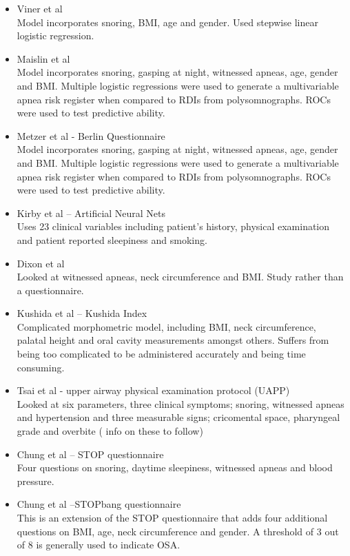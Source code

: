 \begin{itemize}
\item Viner et al\\
Model incorporates snoring, BMI, age and gender. Used stepwise linear logistic regression.
\item Maislin et al\\
Model incorporates snoring, gasping at night, witnessed apneas, age, gender and BMI. Multiple logistic regressions were used to generate a multivariable apnea risk register when compared to RDIs from polysomnographs. ROCs were used to test predictive ability. 
\item Metzer et al - Berlin Questionnaire\\
Model incorporates snoring, gasping at night, witnessed apneas, age, gender and BMI. Multiple logistic regressions were used to generate a multivariable apnea risk register when compared to RDIs from polysomnographs. ROCs were used to test predictive ability. 
\item Kirby et al – Artificial Neural Nets\\
Uses 23 clinical variables including patient’s history, physical examination and patient reported sleepiness and smoking.
\item Dixon et al\\
Looked at witnessed apneas, neck circumference and BMI. Study rather than a questionnaire. 
\item Kushida et al – Kushida Index\\
Complicated morphometric model, including BMI, neck circumference, palatal height and oral cavity measurements amongst others. Suffers from being too complicated to be administered accurately and being time consuming.
\item Tsai et al - upper airway physical examination protocol (UAPP)\\
Looked at six parameters, three clinical symptoms; snoring, witnessed apneas and hypertension and three measurable signs; cricomental space, pharyngeal grade and overbite ( info on these to follow)
\item Chung et al – STOP questionnaire\\
Four questions on snoring, daytime sleepiness, witnessed apneas and blood pressure.
\item Chung et al –STOPbang questionnaire\\
This is an extension of the STOP questionnaire that adds four additional questions on BMI, age, neck circumference and gender. A threshold of 3 out of 8 is generally used to indicate OSA. 

\end{itemize}
